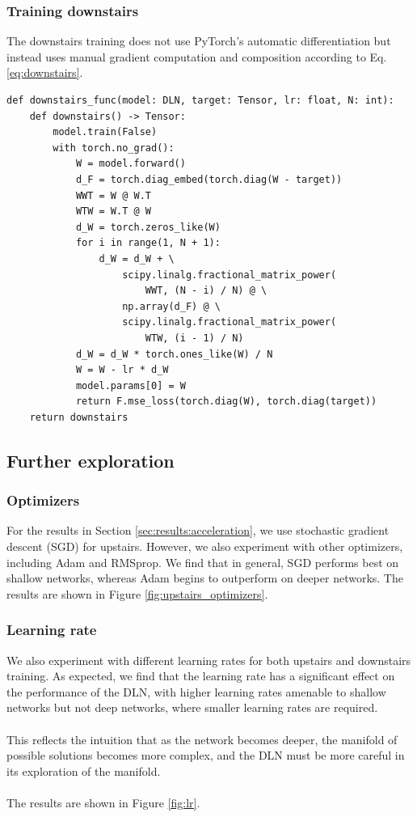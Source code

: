 \documentclass[11pt]{article}
\begin{document}
\subsubsection{Training downstairs}
The downstairs training does not use PyTorch's automatic differentiation but instead uses manual gradient computation and composition according to Eq. \ref {eq:downstairs}.
\begin{verbatim}
def downstairs_func(model: DLN, target: Tensor, lr: float, N: int):
    def downstairs() -> Tensor:
        model.train(False)
        with torch.no_grad():
            W = model.forward()
            d_F = torch.diag_embed(torch.diag(W - target))
            WWT = W @ W.T
            WTW = W.T @ W
            d_W = torch.zeros_like(W)
            for i in range(1, N + 1):
                d_W = d_W + \
                    scipy.linalg.fractional_matrix_power(
                        WWT, (N - i) / N) @ \
                    np.array(d_F) @ \
                    scipy.linalg.fractional_matrix_power(
                        WTW, (i - 1) / N)
            d_W = d_W * torch.ones_like(W) / N
            W = W - lr * d_W
            model.params[0] = W
            return F.mse_loss(torch.diag(W), torch.diag(target))
    return downstairs
\end{verbatim}

\subsection{Further exploration}
\subsubsection{Optimizers}
For the results in Section \ref{sec:results:acceleration}, we use stochastic gradient descent (SGD) for upstairs. However, we also experiment with other optimizers, including Adam and RMSprop. We find that in general, SGD performs best on shallow networks, whereas Adam begins to outperform on deeper networks. The results are shown in Figure \ref{fig:upstairs_optimizers}.

\subsubsection{Learning rate}
We also experiment with different learning rates for both upstairs and downstairs training. As expected, we find that the learning rate has a significant effect on the performance of the DLN, with higher learning rates amenable to shallow networks but not deep networks, where smaller learning rates are required.
\\\\
This reflects the intuition that as the network becomes deeper, the manifold of possible solutions becomes more complex, and the DLN must be more careful in its exploration of the manifold.
\\\\
The results are shown in Figure \ref{fig:lr}.
\end{document}
